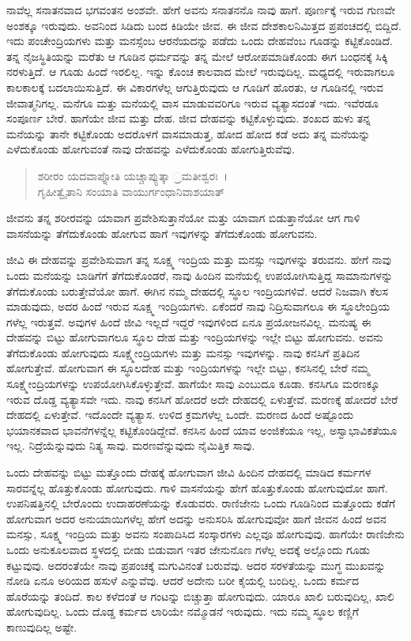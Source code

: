 ನಾವೆಲ್ಲ ಸನಾತನವಾದ ಭಗವಂತನ ಅಂಶವೇ. ಹೇಗೆ ಅವನು ಸನಾತನನೊ ನಾವು ಹಾಗೆ. ಪೂರ್ಣಕ್ಕೆ ಇರುವ ಗುಣವೇ ಅಂಶಕ್ಕೂ ಇರುವುದು. ಅವನಿಂದ ಸಿಡಿದು ಬಂದ ಕಿಡಿಯೇ ಜೀವ. ಈ ಜೀವ ದೇಶಕಾಲನಿಮಿತ್ತದ ಪ್ರಪಂಚದಲ್ಲಿ ಬಿದ್ದಿದೆ. ಇದು ಪಂಚೇಂದ್ರಿಯಗಳು ಮತ್ತು ಮನಸ್ಸೆಂಬ ಆರನೆಯದನ್ನು ಪಡೆದು ಒಂದು ದೇಹವೆಂಬ ಗೂಡನ್ನು ಕಟ್ಟಿಕೊಂಡಿದೆ. ತನ್ನ ನೈಜಸ್ಥಿತಿಯನ್ನು ಮರೆತು ಆ ಗೂಡಿನ ಧರ್ಮವನ್ನು ತನ್ನ ಮೇಲೆ ಆರೋಪಮಾಡಿಕೊಂಡು ಈಗ ಬಂಧನಕ್ಕೆ ಸಿಕ್ಕಿ ನರಳುತ್ತಿದೆ. ಆ ಗೂಡು ಹಿಂದೆ ಇರಲಿಲ್ಲ. ಇನ್ನು ಕೊಂಚ ಕಾಲವಾದ ಮೇಲೆ ಇರುವುದಿಲ್ಲ. ಮಧ್ಯದಲ್ಲಿ ಇರುವಾಗಲೂ ಕಾಲಕಾಲಕ್ಕೆ ಬದಲಾಯಿಸುತ್ತಿದೆ. ಈ ವಿಕಾರಗಳೆಲ್ಲ ಆಗುತ್ತಿರುವುದು ಆ ಗೂಡಿಗೆ ಹೊರತು, ಆ ಗೂಡಿನಲ್ಲಿ ಇರುವ ಜೀವಾತ್ಮನಿಗಲ್ಲ. ಮನೆಗೂ ಮತ್ತು ಮನೆಯಲ್ಲಿ ವಾಸ ಮಾಡುವವರಿಗೂ ಇರುವ ವ್ಯತ್ಯಾಸದಂತೆ ಇದು. ಇವೆರಡೂ ಸಂಪೂರ್ಣ ಬೇರೆ. ಹಾಗೆಯೇ ಜೀವ ಮತ್ತು ದೇಹ. ಜೀವ ದೇಹವನ್ನು ಕಟ್ಟಿಕೊಳ್ಳುವುದು. ಶಂಖದ ಹುಳು ತನ್ನ ಮನೆಯನ್ನು ತಾನೇ ಕಟ್ಟಿಕೊಂಡು ಅದರೊಳಗೆ ವಾಸಮಾಡುತ್ತ, ಹೋದ ಹೋದ ಕಡೆ ಅದು ತನ್ನ ಮನೆಯನ್ನು ಎಳೆದುಕೊಂಡು ಹೋಗುವಂತೆ ನಾವು ದೇಹವನ್ನು ಎಳೆದುಕೊಂಡು ಹೋಗುತ್ತಿರುವೆವು.

\begin{verse}
ಶರೀರಂ ಯದವಾಪ್ನೋತಿ ಯಚ್ಚಾಪ್ಯುತ್ಕಾ ್ರಮತೀಶ್ವರಃ~।\\ಗೃಹೀತ್ವೈತಾನಿ ಸಂಯಾತಿ ವಾಯುರ್ಗಂಧಾನಿವಾಶಯಾತ್ 
\end{verse}

{\small ಜೀವನು ತನ್ನ ಶರೀರವನ್ನು ಯಾವಾಗ ಪ್ರವೇಶಿಸುತ್ತಾನೆಯೋ ಮತ್ತು ಯಾವಾಗ ಬಿಡುತ್ತಾನೆಯೋ ಆಗ ಗಾಳಿ ವಾಸನೆಯನ್ನು ತೆಗೆದುಕೊಂಡು ಹೋಗುವ ಹಾಗೆ ಇವುಗಳನ್ನು ತೆಗೆದುಕೊಂಡು ಹೋಗುವನು.}

ಜೀವಿ ಈ ದೇಹವನ್ನು ಪ್ರವೇಶಿಸುವಾಗ ತನ್ನ ಸೂಕ್ಷ್ಮ ಇಂದ್ರಿಯ ಮತ್ತು ಮನಸ್ಸು ಇವುಗಳನ್ನು ತರುವನು. ಹೇಗೆ ನಾವು ಒಂದು ಮನೆಯನ್ನು ಬಾಡಿಗೆಗೆ ತೆಗೆದುಕೊಂಡರೆ, ನಾವು ಹಿಂದಿನ ಮನೆಯಲ್ಲಿ ಉಪಯೋಗಿಸುತ್ತಿದ್ದ ಸಾಮಾನುಗಳನ್ನು ತೆಗೆದುಕೊಂಡು ಬರುತ್ತೇವೆಯೋ ಹಾಗೆ. ಈಗಿನ ನಮ್ಮ ದೇಹದಲ್ಲಿ ಸ್ಥೂಲ ಇಂದ್ರಿಯಗಳಿವೆ. ಆದರೆ ನಿಜವಾಗಿ ಕೆಲಸ ಮಾಡುವುದು, ಅದರ ಹಿಂದೆ ಇರುವ ಸೂಕ್ಷ್ಮ ಇಂದ್ರಿಯಗಳು. ಏಕೆಂದರೆ ನಾವು ನಿದ್ರಿಸುವಾಗಲೂ ಈ ಸ್ಥೂಲೇಂದ್ರಿಯ ಗಳೆಲ್ಲ ಇರುತ್ತವೆ. ಅವುಗಳ ಹಿಂದೆ ಜೀವಿ ಇಲ್ಲದೆ ಇದ್ದರೆ ಇವುಗಳಿಂದ ಏನೂ ಪ್ರಯೋಜನವಿಲ್ಲ. ಮನುಷ್ಯ ಈ ದೇಹವನ್ನು ಬಿಟ್ಟು ಹೋಗುವಾಗಲೂ ಸ್ಥೂಲ ದೇಹ ಮತ್ತು ಇಂದ್ರಿಯಗಳನ್ನು ಇಲ್ಲೇ ಬಿಟ್ಟು ಹೋಗುವನು. ಅವನು ತೆಗೆದುಕೊಂಡು ಹೋಗುವುದು ಸೂಕ್ಷ್ಮೇಂದ್ರಿಯಗಳು ಮತ್ತು ಮನಸ್ಸು ಇವುಗಳನ್ನು. ನಾವು ಕನಸಿಗೆ ಪ್ರತಿದಿನ ಹೋಗುತ್ತೇವೆ. ಹೋಗುವಾಗ ಈ ಸ್ಥೂಲದೇಹ ಮತ್ತು ಇಂದ್ರಿಯಗಳನ್ನು ಇಲ್ಲೇ ಬಿಟ್ಟು, ಕನಸಿನಲ್ಲಿ ಬೇರೆ ನಮ್ಮ ಸೂಕ್ಷ್ಮೇಂದ್ರಿಯಗಳನ್ನು ಉಪಯೋಗಿಸಿಕೊಳ್ಳುತ್ತೇವೆ. ಹಾಗೆಯೇ ಸಾವು ಎಂಬುದೂ ಕೂಡಾ. ಕನಸಿಗೂ ಮರಣಕ್ಕೂ ಇರುವ ದೊಡ್ಡ ವ್ಯತ್ಯಾಸವೇ ಇದು. ನಾವು ಕನಸಿಗೆ ಹೋದರೆ ಅದೇ ದೇಹದಲ್ಲಿ ಏಳುತ್ತೇವೆ. ಮರಣಕ್ಕೆ ಹೋದರೆ ಬೇರೆ ದೇಹದಲ್ಲಿ ಏಳುತ್ತೇವೆ. ಇದೊಂದೇ ವ್ಯತ್ಯಾಸ. ಉಳಿದ ಕ್ರಮಗಳೆಲ್ಲ ಒಂದೇ. ಮರಣದ ಹಿಂದೆ ಅಷ್ಟೊಂದು ಭಯಾನಕವಾದ ಭಾವನೆಗಳನ್ನೆಲ್ಲ ಕಟ್ಟಿಕೊಂಡಿದ್ದೇವೆ. ಕನಸಿನ ಹಿಂದೆ ಯಾವ ಅಂಜಿಕೆಯೂ ಇಲ್ಲ, ಅಸ್ವಾಭಾವಿಕತೆಯೂ ಇಲ್ಲ. ನಿದ್ರೆಯೆನ್ನುವುದು ನಿತ್ಯ ಸಾವು. ಮರಣವೆನ್ನುವುದು ನೈಮಿತ್ತಿಕ ಸಾವು.

ಒಂದು ದೇಹವನ್ನು ಬಿಟ್ಟು ಮತ್ತೊಂದು ದೇಹಕ್ಕೆ ಹೋಗುವಾಗ ಜೀವಿ ಹಿಂದಿನ ದೇಹದಲ್ಲಿ ಮಾಡಿದ ಕರ್ಮಗಳ ಸಾರವನ್ನೆಲ್ಲ ಹೊತ್ತುಕೊಂಡು ಹೋಗುವುದು. ಗಾಳಿ ವಾಸನೆಯನ್ನು ಹೇಗೆ ಹೊತ್ತುಕೊಂಡು ಹೋಗುವುದೋ ಹಾಗೆ. ಉಪನಿಷತ್ತಿನಲ್ಲಿ ಬೇರೊಂದು ಉದಾಹರಣೆಯನ್ನು ಕೊಡುವರು. ರಾಣಿಜೇನು ಒಂದು ಗೂಡಿನಿಂದ ಮತ್ತೊಂದು ಕಡೆಗೆ ಹೋಗುವಾಗ ಅದರ ಅನುಯಾಯಿಗಳೆಲ್ಲ ಹೇಗೆ ಅದನ್ನು ಅನುಸರಿಸಿ ಹೋಗುವುವೋ ಹಾಗೆ ಜೀವನ ಹಿಂದೆ ಅವನ ಮನಸ್ಸು, ಸೂಕ್ಷ್ಮ ಇಂದ್ರಿಯ ಮತ್ತು ಅವನು ಸಂಪಾದಿಸಿದ ಸಂಸ್ಕಾರಗಳು ಎಲ್ಲವೂ ಹೋಗುವುವು. ಹಾಗೆಯೇ ರಾಣಿಜೇನು ಒಂದು ಅನುಕೂಲವಾದ ಸ್ಥಳದಲ್ಲಿ ಬೀಡು ಬಿಡುವಾಗ ಇತರ ಜೇನುನೊಣ ಗಳೆಲ್ಲ ಅದಕ್ಕೆ ಅಲ್ಲೊಂದು ಗೂಡು ಕಟ್ಟುವುವು. ಅದರಂತೆಯೇ ನಾವು ಪ್ರಪಂಚಕ್ಕೆ ಮಗುವಿನಂತೆ ಬರುವೆವು. ಅದರ ಸರಳತೆಯನ್ನು ಮುಗ್ಧ ಮುಖವನ್ನು ನೋಡಿ ಏನೂ ಅರಿಯದ ಹಸುಳೆ ಎನ್ನುವೆವು. ಆದರೆ ಅದೇನು ಬರೀ ಕೈಯಲ್ಲಿ ಬಂದಿಲ್ಲ. ಒಂದು ಕರ್ಮದ ಹೊರೆಯನ್ನು ತಂದಿದೆ. ಕಾಲ ಕಳೆದಂತೆ ಆ ಗಂಟನ್ನು ಬಿಚ್ಚುತ್ತಾ ಹೋಗುವುದು. ಯಾರೂ ಖಾಲಿ ಬರುವುದಿಲ್ಲ, ಖಾಲಿ ಹೋಗುವುದಿಲ್ಲ. ಒಂದು ದೊಡ್ಡ ಕರ್ಮದ ಲಾರಿಯೇ ನಮ್ಮೊಡನೆ ಇರುವುದು. ಇದು ನಮ್ಮ ಸ್ಥೂಲ ಕಣ್ಣಿಗೆ ಕಾಣುವುದಿಲ್ಲ ಅಷ್ಟೇ.

